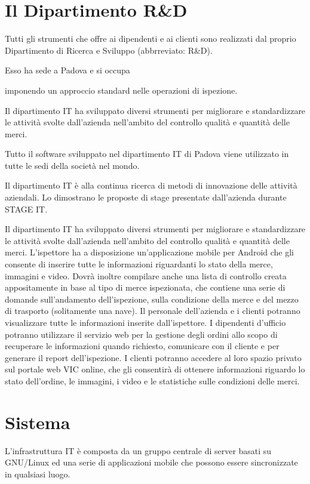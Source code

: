 \section{Il Dipartimento R\&D}
	Tutti gli strumenti che  \vic{} offre ai dipendenti e ai clienti sono realizzati dal proprio Dipartimento di Ricerca e Sviluppo (abbrreviato: R\&D).
	
	Esso ha sede a Padova e si occupa
	
	
	imponendo un approccio standard nelle operazioni di ispezione.
	
	
	Il dipartimento IT ha sviluppato diversi strumenti per migliorare e standardizzare le
	attività svolte dall’azienda nell’ambito del controllo qualità e quantità delle merci.

		Tutto il software sviluppato nel dipartimento IT di Padova viene utilizzato in tutte le
	sedi della società nel mondo.
	
	Il dipartimento IT è alla continua ricerca di metodi di innovazione delle attività
	aziendali. Lo dimostrano le proposte di stage presentate dall’azienda durante STAGE
	IT. 
	
	
	Il dipartimento IT ha sviluppato diversi strumenti per migliorare e standardizzare le
	attività svolte dall’azienda nell’ambito del controllo qualità e quantità delle merci.
	L’ispettore ha a disposizione un’applicazione mobile per Android che gli consente di
	inserire tutte le informazioni riguardanti lo stato della merce, immagini e video. Dovrà
	inoltre compilare anche una lista di controllo creata appositamente in base al tipo di
	merce ispezionata, che contiene una serie di domande sull’andamento dell’ispezione,
	sulla condizione della merce e del mezzo di trasporto (solitamente una nave).
	Il personale dell’azienda e i clienti potranno visualizzare tutte le informazioni inserite
	dall’ispettore. I dipendenti d’ufficio potranno utilizzare il servizio web per la gestione
	degli ordini allo scopo di recuperare le informazioni quando richiesto, comunicare con il
	cliente e per generare il report dell’ispezione.
	I clienti potranno accedere al loro spazio privato sul portale web VIC online, che gli
	consentirà di ottenere informazioni riguardo lo stato dell’ordine, le immagini, i video e
	le statistiche sulle condizioni delle merci.


\section{Sistema}
	L'infrastruttura IT è composta da un gruppo centrale di server basati su GNU/Linux ed una serie di applicazioni mobile che possono essere sincronizzate in 
	qualsiasi luogo.
	
